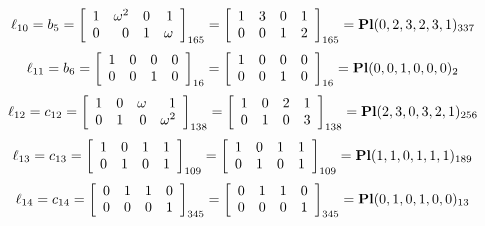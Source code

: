 $$
\ell_{10} = b_{5} = 
\left[
\begin{array}{*{4}{r}}
1 & \omega^{2} & 0 & 1\\
0 & 0 & 1 & \omega \\
\end{array}
\right]
_{165}
=
\left[
\begin{array}{*{4}c}
1  & 3  & 0  & 1\\
0  & 0  & 1  & 2\\
\end{array}
\right]_{165}
={\rm\bf Pl}(0,2,3,2,3,1 )_{337}$$
$$
\ell_{11} = b_{6} = 
\left[
\begin{array}{*{4}{r}}
1 & 0 & 0 & 0\\
0 & 0 & 1 & 0\\
\end{array}
\right]
_{16}
=
\left[
\begin{array}{*{4}c}
1  & 0  & 0  & 0\\
0  & 0  & 1  & 0\\
\end{array}
\right]_{16}
={\rm\bf Pl}(0,0,1,0,0,0 )_{2}$$
$$
\ell_{12} = c_{12} = 
\left[
\begin{array}{*{4}{r}}
1 & 0 & \omega  & 1\\
0 & 1 & 0 & \omega^{2}\\
\end{array}
\right]
_{138}
=
\left[
\begin{array}{*{4}c}
1  & 0  & 2  & 1\\
0  & 1  & 0  & 3\\
\end{array}
\right]_{138}
={\rm\bf Pl}(2,3,0,3,2,1 )_{256}$$
$$
\ell_{13} = c_{13} = 
\left[
\begin{array}{*{4}{r}}
1 & 0 & 1 & 1\\
0 & 1 & 0 & 1\\
\end{array}
\right]
_{109}
=
\left[
\begin{array}{*{4}c}
1  & 0  & 1  & 1\\
0  & 1  & 0  & 1\\
\end{array}
\right]_{109}
={\rm\bf Pl}(1,1,0,1,1,1 )_{189}$$
$$
\ell_{14} = c_{14} = 
\left[
\begin{array}{*{4}{r}}
0 & 1 & 1 & 0\\
0 & 0 & 0 & 1\\
\end{array}
\right]
_{345}
=
\left[
\begin{array}{*{4}c}
0  & 1  & 1  & 0\\
0  & 0  & 0  & 1\\
\end{array}
\right]_{345}
={\rm\bf Pl}(0,1,0,1,0,0 )_{13}$$
